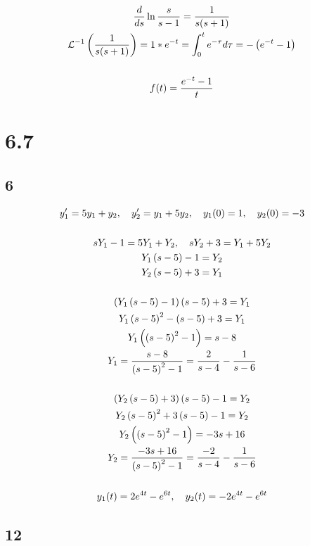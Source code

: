 \begin{gather*}
	\frac{d}{ds} \ln{\frac{s}{s - 1}} = \frac{1}{s (s + 1)} \\
	\mathcal{L}^{-1}\left( \frac{1}{s (s + 1)} \right) =
	1 * e^{-t} =
	\int_0^t{e^{- \tau} d\tau} = - \left( e^{-t} - 1 \right) \\ \\
	f(t) = \frac{e^{-t} - 1}{t}
\end{gather*}


\newpage


\section*{6.7}


\subsection*{6}


\begin{gather*}
	y_1' = 5 y_1 + y_2, \quad
	y_2' = y_1 + 5 y_2, \quad
	y_1(0) = 1, \quad
	y_2(0) = -3 \\ \\
	s Y_1 - 1 = 5 Y_1 + Y_2, \quad
	s Y_2 + 3 = Y_1 + 5 Y_2 \\
	Y_1 \left( s - 5 \right) - 1	= Y_2 \\
	Y_2 \left( s - 5 \right) + 3 = Y_1 \\ \\
	\left( Y_1 \left( s - 5 \right) - 1 \right) \left( s - 5 \right) + 3 = Y_1 \\
	Y_1 \left( s - 5 \right)^2 - \left( s - 5 \right) + 3 = Y_1 \\
	Y_1 \left( \left( s - 5 \right)^2 - 1 \right) = s - 8 \\
	Y_1 = \frac{s - 8}{\left( s - 5 \right)^2 - 1} =
	\frac{2}{s - 4} - \frac{1}{s - 6} \\ \\
	\left( Y_2 \left( s - 5 \right) + 3 \right) \left( s - 5 \right) - 1 = Y_2 \\
	Y_2 \left( s - 5 \right)^2 + 3 \left( s - 5 \right) - 1 = Y_2 \\
	Y_2 \left( \left( s - 5 \right)^2 - 1 \right) = -3 s + 16 \\
	Y_2 = \frac{-3 s + 16}{\left( s - 5 \right)^2 - 1} =
	\frac{-2}{s - 4} - \frac{1}{s - 6} \\ \\
	y_1(t) = 2 e^{4 t} - e^{6 t}, \quad
	y_2(t) = - 2 e^{4 t} - e^{6 t}
\end{gather*}


\subsection*{12}


